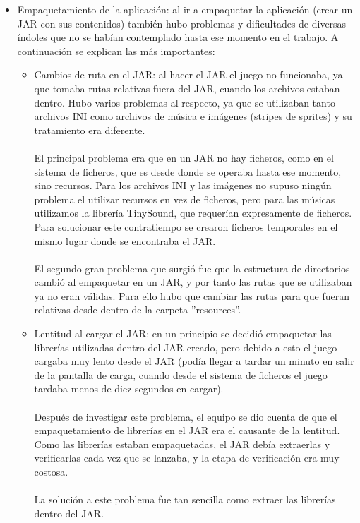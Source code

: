 \documentclass[a4paper]{article}
\begin{document}
\begin{itemize}
\item Empaquetamiento de la aplicación: al ir a empaquetar la aplicación (crear un JAR con sus contenidos) también hubo problemas y dificultades de diversas índoles que no se habían contemplado hasta ese momento en el trabajo. A continuación se explican las más importantes:

	\begin{itemize}
	\item Cambios de ruta en el JAR: al hacer el JAR el juego no funcionaba, ya que tomaba rutas relativas fuera del JAR, cuando los archivos estaban dentro. Hubo varios problemas al respecto, ya que se utilizaban tanto archivos INI como archivos de música e imágenes (stripes de sprites) y su tratamiento era diferente.
	
	\paragraph{}El principal problema era que en un JAR no hay ficheros, como en el sistema de ficheros, que es desde donde se operaba hasta ese momento, sino recursos. Para los archivos INI y las imágenes no supuso ningún problema el utilizar recursos en vez de ficheros, pero para las músicas utilizamos la librería TinySound, que requerían expresamente de ficheros. Para solucionar este contratiempo se crearon ficheros temporales en el mismo lugar donde se encontraba el JAR.
	
	\paragraph{}El segundo gran problema que surgió fue que la estructura de directorios cambió al empaquetar en un JAR, y por tanto las rutas que se utilizaban ya no eran válidas. Para ello hubo que cambiar las rutas para que fueran relativas desde dentro de la carpeta ''resources''.
	
	\item Lentitud al cargar el JAR: en un principio se decidió empaquetar las librerías utilizadas dentro del JAR creado, pero debido a esto el juego cargaba muy lento desde el JAR (podía llegar a tardar un minuto en salir de la pantalla de carga, cuando desde el sistema de ficheros el juego tardaba menos de diez segundos en cargar).
	
	\paragraph{}Después de investigar este problema, el equipo se dio cuenta de que el empaquetamiento de librerías en el JAR era el causante de la lentitud. Como las librerías estaban empaquetadas, el JAR debía extraerlas y verificarlas cada vez que se lanzaba, y la etapa de verificación era muy costosa.
	
	\paragraph{}La solución a este problema fue tan sencilla como extraer las librerías dentro del JAR.
	\end{itemize}

\end{itemize}
\newpage
\end{document}
